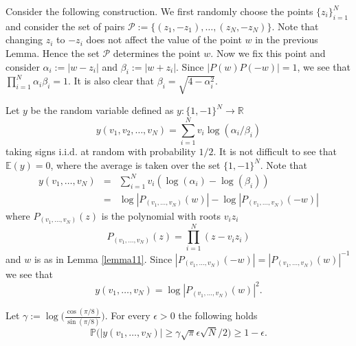 \documentclass[smallextended]{svjour3}
\begin{document}
\par Consider the following construction. We first randomly choose the points $\{z_{i}\}_{i=1}^{N}$ and consider the set of pairs $\mathcal{P}:=\{(z_1,-z_1),\ldots,(z_N,-z_N)\}$. Note that changing $z_i$ to $-z_i$ does not affect the value of the point $w$ in the previous Lemma. Hence the set $\mathcal{P}$ determines the point $w$. Now we fix this point and consider $\alpha_{i}:=|w-z_i|$ and $\beta_{i}:=|w+z_i|$. Since $|P(w)P(-w)|=1$, we see that $\prod_{i=1}^{N}{\alpha_i \beta_i}=1$. It is also clear that $\beta_i = \sqrt{4-\alpha_i^{2}}$. 

\par Let $y$ be the random variable defined as $y:\{1,-1\}^{N}\to{\ensuremath{\mathbb{R}}}$
$$
y(v_1,v_2,\ldots,v_N) = \sum_{i=1}^{N}{v_{i}\log(\alpha_i/\beta_i)}
$$
taking signs i.i.d. at random with probability $1/2$. It is not difficult to see that $\mathbb{E}(y)=0$, where the average is taken over the set $\{1,-1\}^{N}$. Note that 
\begin{eqnarray*}
y(v_1,\ldots,v_N) & = & \sum_{i=1}^{N}{v_{i}(\log(\alpha_i)-\log(\beta_i))}\\ 
& = &\log|P_{(v_1,\ldots,v_N)}(w)|-\log|P_{(v_1,\ldots,v_N)}(-w)|
\end{eqnarray*}
where $P_{(v_1,\ldots,v_N)}(z)$ is the polynomial with roots $v_{i}z_{i}$
\begin{equation}
P_{(v_1,\ldots,v_N)}(z) = \prod_{i=1}^{N}{(z-v_{i}z_{i})}
\end{equation}
and $w$ is as in Lemma \ref{lemma11}. Since $|P_{(v_1,\ldots,v_N)}(-w)|=|P_{(v_1,\ldots,v_N)}(w)|^{-1}$ we see that
\begin{equation}\label{fund}
y(v_1,\ldots,v_N) = \log|P_{(v_1,\ldots,v_N)}(w)|^{2}.
\end{equation}

\begin{theorem} Let $\gamma:=\log\Big(\frac{\cos(\pi/8)}{\sin(\pi/8)}\Big)$. For every $\epsilon>0$ the following holds 
$$
\mathbb{P}\Big(|y(v_1,\ldots,v_N)|\geq \gamma\sqrt{\pi}\epsilon\sqrt{N}/2\Big)\geq 1-\epsilon.
$$
\end{theorem}
\end{document}
